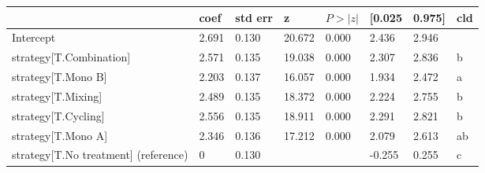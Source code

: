 \begin{tabular}{llllllll}
\toprule
 & coef & std err & z & $P>|z|$ & [0.025 & 0.975] & cld \\
\midrule
Intercept & 2.691 & 0.130 &    20.672 &  0.000 & 2.436 & 2.946 &  \\
strategy[T.Combination] & 2.571 & 0.135 &    19.038 &  0.000 & 2.307 & 2.836 & b \\
strategy[T.Mono B] & 2.203 & 0.137 &    16.057 &  0.000 & 1.934 & 2.472 & a \\
strategy[T.Mixing] & 2.489 & 0.135 &    18.372 &  0.000 & 2.224 & 2.755 & b \\
strategy[T.Cycling] & 2.556 & 0.135 &    18.911 &  0.000 & 2.291 & 2.821 & b \\
strategy[T.Mono A] & 2.346 & 0.136 &    17.212 &  0.000 & 2.079 & 2.613 & ab \\
strategy[T.No treatment] (reference) & 0 & 0.130 &  &  & -0.255 & 0.255 & c \\
\bottomrule
\end{tabular}
